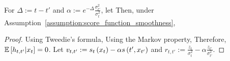 \begin{lemma}\label{lemma:bootstrap_variance}For $\Delta := t-t'$ and $\alpha := e^{-\Delta}\frac{\sigma_{t'}^{2}}{\sigma_{t}^{2}}$, let
Then,  under Assumption~\ref{assumption:score_function_smoothness},
\end{lemma}
\begin{proof}
     Using Tweedie's formula, 
    Using the Markov property, 
    Therefore, $\mathbb{E}\left[h_{t,t'}|x_{t}\right] = 0$. Let  $v_{t,t'} := s_{t}\left(x_{t}\right) - \alpha s\left(t', x_{t'}\right)$ and $r_{t,t'} := \frac{z_{t}}{\sigma_{t}^{2}} - \alpha\frac{z_{t'}}{\sigma_{t'}^{2}}$.


\end{proof}
